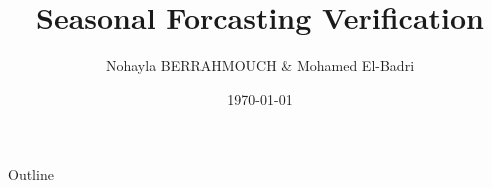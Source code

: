 \documentclass[11pt]{beamer}
\title[S-F]{Seasonal Forcasting Verification}
\author[N.BERRAHMOUCH \& M.EL-BADRI]{Nohayla BERRAHMOUCH  \& Mohamed El-Badri}
\institute{EHTP}
\date{\today}
\begin{document}
\begin{frame}
	\maketitle
\end{frame}

\begin{frame}{Outline}
	\tableofcontents
\end{frame}









\end{document}
